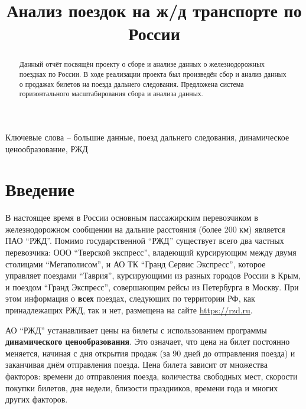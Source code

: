 \documentclass[conference]{IEEEtran}
\begin{document}
\title{Анализ поездок на ж/д транспорте по России}

\author{
\and
{}
}

\maketitle

\begin{abstract}
Данный отчёт посвящён проекту о сборе и анализе данных о железнодорожных поездках по России. В ходе реализации проекта был произведён сбор и анализ данных о продажах билетов на поезда дальнего следования. Предложена система горизонтального масштабирования сбора и анализа данных.
\end{abstract}

Ключевые слова -- большие данные, поезд дальнего следования, динамическое ценообразование, РЖД


\section{Введение}
В настоящее время в России основным пассажирским перевозчиком в железнодорожном сообщении на дальние расстояния (более 200 км) является ПАО ``РЖД''. Помимо государственной ``РЖД'' существует всего два частных перевозчика: ООО ``Тверской экспресс'', владеющий курсирующим между двумя столицами ``Мегаполисом'', и АО ТК ``Гранд Сервис Экспресс'', которое управляет поездами ``Таврия'', курсирующими из разных городов России в Крым, и поездом ``Гранд Экспресс'', совершающим рейсы из Петербурга в Москву. При этом информация о \textbf{всех} поездах, следующих по территории РФ, как принадлежащих РЖД, так и нет, размещена на сайте \href{https://rzd.ru}{https://rzd.ru}.

АО ``РЖД'' устанавливает цены на билеты с использованием программы \textbf{динамического ценообразования}. Это означает, что цена на билет постоянно меняется, начиная с дня открытия продаж (за 90 дней до отправления поезда) и заканчивая днём отправления поезда. Цена билета зависит от множества факторов: времени до отправления поезда, количества свободных мест, скорости покупки билетов, дня недели, близости праздников, времени года и многих других факторов.
\end{document}
